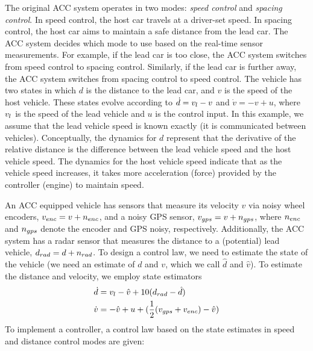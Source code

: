 %
%
The original ACC system operates in two modes: \emph{speed control} and \emph{spacing control}. In speed control, the host car travels at a driver-set speed. In spacing control, the host car aims to maintain a safe distance from the lead car. 
%
The ACC system decides which mode to use based on the real-time sensor measurements. 
%
For example, if the lead car is too close, the ACC system switches from speed control to spacing control. 
%
Similarly, if the lead car is further away, the ACC system switches from spacing control to speed control. %
%
The vehicle has two states in which $d$ is the distance to the lead car, and $v$ is the speed of the host vehicle. These states evolve according to $\dot{d} = v_{l} - v$ and $\dot{v} = -v + u$, 
%
where $v_{l}$ is the speed of the lead vehicle  and $u$ is the control input.  In this example, we assume that the lead vehicle speed is known exactly (\eg it is communicated between vehicles). Conceptually, the dynamics for $d$ represent that the derivative of the relative distance is the difference between the lead vehicle speed and the host vehicle speed. The dynamics for the host vehicle speed indicate that as the vehicle speed increases, it takes more acceleration (\ie force) provided by the controller (\ie engine) to maintain speed. 

An ACC equipped vehicle has sensors that measure its velocity $v$ via noisy wheel encoders, $v_{enc} = v + n_{enc}$, and a noisy GPS sensor, $v_{gps} = v+n_{gps}$, where $n_{enc}$ and $n_{gps}$ denote the encoder and GPS noisy, respectively. 
%
%
Additionally, the ACC system has a radar sensor that measures the distance to a (potential) lead vehicle, $d_{rad} = d+n_{rad}$. 
%
To design a control law, we need to estimate the state of the vehicle (\ie we need an estimate of $d$ and $v$, which we call $\hat{d}$ and $\hat{v}$). To estimate the distance and velocity, we employ state estimators
%
\begin{align}
\dot{d} & = v_{l} - \hat{v} + 10(d_{rad} - \hat{d}) \nonumber \\
\dot{v} & = -\hat{v} + u +  (\frac{1}{2} (v_{gps} + v_{enc}) - \hat{v}) 
\end{align}
%
%
To implement a controller, a control law based on the state estimates in speed and distance control modes are given: 

